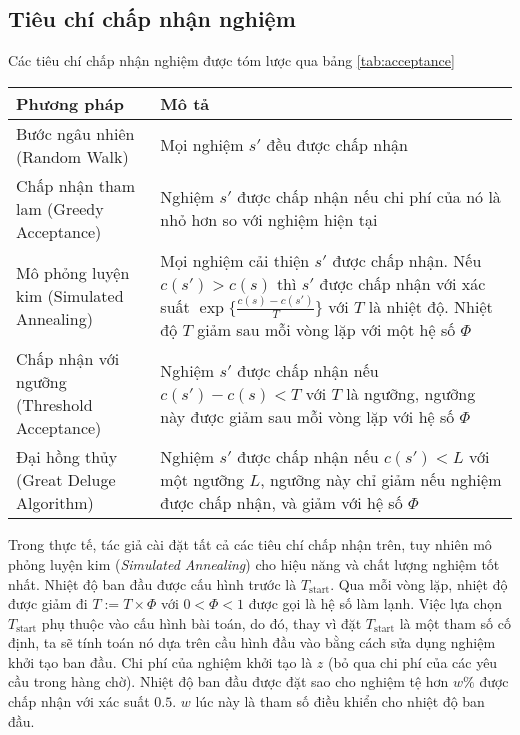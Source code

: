 \subsection{Tiêu chí chấp nhận nghiệm}

Các tiêu chí chấp nhận nghiệm được tóm lược qua bảng \ref{tab:acceptance}

\begin{table}[caption={Tiêu chí chấp nhận nghiệm}, label=tab:acceptance]
  \begin{tabularx}{\textwidth}{|X|X|}
    \hline
    Phương pháp & Mô tả \\ \hline
    Bước ngâu nhiên (Random Walk) & Mọi nghiệm $s'$ đều được chấp nhận \\ \hline
    Chấp nhận tham lam (Greedy Acceptance) & Nghiệm $s'$ được chấp nhận nếu chi phí của nó là nhỏ hơn so với nghiệm hiện tại \\ \hline
    Mô phỏng luyện kim (Simulated Annealing) & Mọi nghiệm cải thiện $s'$ được chấp nhận. Nếu $c(s') > c(s)$ thì $s'$ được chấp nhận với xác suất $\exp \{ \frac{c(s) - c(s')}{T} \}$ với $T$ là nhiệt độ. Nhiệt độ $T$ giảm sau mỗi vòng lặp với một hệ số $\Phi$ \\ \hline
    Chấp nhận với ngưỡng (Threshold Acceptance) & Nghiệm $s'$ được chấp nhận nếu $c(s') - c(s) < T$ với $T$ là ngưỡng, ngưỡng này được giảm sau mỗi vòng lặp với hệ số $\Phi$ \\ \hline
    Đại hồng thủy (Great Deluge Algorithm) & Nghiệm $s'$ được chấp nhận nếu $c(s') < L$ với một ngưỡng $L$, ngưỡng này chỉ giảm nếu nghiệm được chấp nhận, và giảm với hệ số $\Phi$ \\ \hline
    \end{tabularx}
\end{table}
Trong thực tế, tác giả cài đặt tất cả các tiêu chí chấp nhận trên, tuy nhiên mô phỏng luyện kim (\textit{Simulated Annealing}) cho hiệu năng và chất lượng nghiệm tốt nhất. Nhiệt độ ban đầu được cấu hình trước là $T_{\text{start}}$. Qua mỗi vòng lặp, nhiệt độ được giảm đi $T := T \times \Phi$ với $0 < \Phi < 1$ được gọi là hệ số làm lạnh. Việc lựa chọn $T_{\text{start}}$ phụ thuộc vào cấu hình bài toán, do đó, thay vì đặt $T_{\text{start}}$ là một tham số cố định, ta sẽ tính toán nó dựa trên cầu hình đầu vào bằng cách sửa dụng nghiệm khởi tạo ban đầu. Chi phí của nghiệm khởi tạo là $z$ (bỏ qua chi phí của các yêu cầu trong hàng chờ). Nhiệt độ ban đầu được đặt sao cho nghiệm tệ hơn $w\%$ được chấp nhận với xác suất $0.5$. $w$ lúc này là tham số điều khiển cho nhiệt độ ban đầu. 
